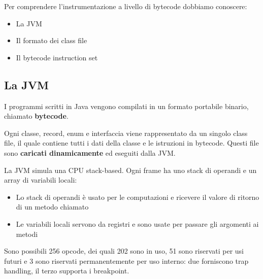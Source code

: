 
Per comprendere l'instrumentazione a livello di bytecode dobbiamo conoscere:
\begin{itemize}
    \item La JVM

    \item Il formato dei class file

    \item Il bytecode instruction set
\end{itemize}


\subsection{La JVM}

I programmi scritti in Java vengono compilati in un formato portabile binario, chiamato \textbf{bytecode}.

Ogni classe, record, enum e interfaccia viene rappresentato da un singolo class file, il quale contiene tutti i dati della classe e le istruzioni in bytecode. Questi file sono \textbf{caricati dinamicamente} ed eseguiti dalla JVM.


La JVM simula una CPU stack-based. Ogni frame ha uno stack di operandi e un array di variabili locali:
\begin{itemize}
    \item Lo stack di operandi è usato per le computazioni e ricevere il valore di ritorno di un metodo chiamato

    \item Le variabili locali servono da registri e sono usate per passare gli argomenti ai metodi
\end{itemize}

Sono possibili 256 opcode, dei quali 202 sono in uso, 51 sono riservati per usi futuri e 3 sono riservati permanentemente per uso interno: due forniscono trap handling, il terzo supporta i breakpoint.

